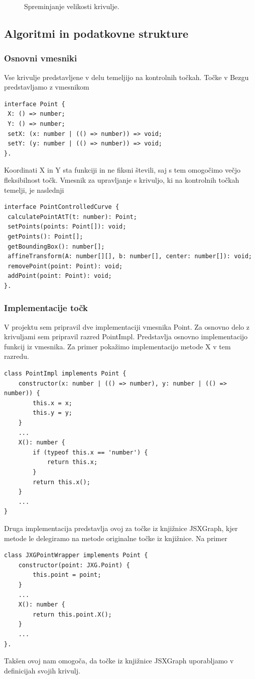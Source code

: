 \documentclass[isrm2, tisk]{fmfdelo}
\begin{document}
\begin{figure}[h!]
        \caption{Spreminjanje velikosti krivulje.}
        \label{fig:bezier:prikaz-rezultata}
    \end{figure}

    \subsection{Algoritmi in podatkovne strukture}

    \subsubsection{Osnovni vmesniki}\label{subsubsec:osnovni-vmesniki}
    Vse krivulje predstavljene v delu temeljijo na kontrolnih točkah.
    Točke v Bezgu predstavljamo z vmesnikom
    \begin{lstlisting}[label={lst:vmesnik-tocke}]
interface Point {
 X: () => number;
 Y: () => number;
 setX: (x: number | (() => number)) => void;
 setY: (y: number | (() => number)) => void;
}.
    \end{lstlisting}
    Koordinati X in Y sta funkciji in ne fiksni števili, saj s tem omogočimo večjo fleksibilnost točk.
    Vmesnik za upravljanje s krivuljo, ki na kontrolnih točkah temelji, je naslednji
    \begin{lstlisting}[label={lst:vmesnik-curve}]
interface PointControlledCurve {
 calculatePointAtT(t: number): Point;
 setPoints(points: Point[]): void;
 getPoints(): Point[];
 getBoundingBox(): number[];
 affineTransform(A: number[][], b: number[], center: number[]): void;
 removePoint(point: Point): void;
 addPoint(point: Point): void;
}.
    \end{lstlisting}

    \subsubsection{Implementacije točk}
    V projektu sem pripravil dve implementaciji vmesnika Point.
    Za osnovno delo z krivuljami sem pripravil razred PointImpl.
    Predstavlja osnovno implementacijo funkcij iz vmesnika.
    Za primer pokažimo implementacijo metode X v tem razredu.
    \begin{lstlisting}[label={lst:point-impl}]
class PointImpl implements Point {
    constructor(x: number | (() => number), y: number | (() => number)) {
        this.x = x;
        this.y = y;
    }
    ...
    X(): number {
        if (typeof this.x == 'number') {
            return this.x;
        }
        return this.x();
    }
    ...
}
    \end{lstlisting}
    Druga implementacija predstavlja ovoj za točke iz knjižnice JSXGraph, kjer metode le delegiramo na metode originalne točke iz knjižnice.
    Na primer
    \begin{lstlisting}[label={lst:jsx-point-impl}]
class JXGPointWrapper implements Point {
    constructor(point: JXG.Point) {
        this.point = point;
    }
    ...
    X(): number {
        return this.point.X();
    }
    ...
}.
    \end{lstlisting}
    Takšen ovoj nam omogoča, da točke iz knjižnice JSXGraph uporabljamo v definicijah svojih krivulj.
\end{document}
